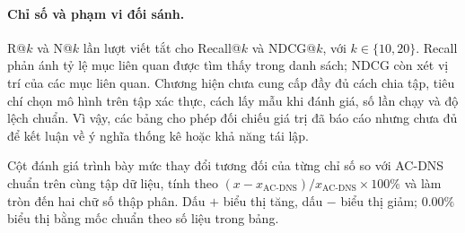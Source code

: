 \paragraph{Chỉ số và phạm vi đối sánh.}
R@$k$ và N@$k$ lần lượt viết tắt cho Recall@$k$ và NDCG@$k$, với $k\in\{10,20\}$. Recall phản ánh tỷ lệ mục liên quan được tìm thấy trong danh sách; NDCG còn xét vị trí của các mục liên quan. Chương hiện chưa cung cấp đầy đủ cách chia tập, tiêu chí chọn mô hình trên tập xác thực, cách lấy mẫu khi đánh giá, số lần chạy và độ lệch chuẩn. Vì vậy, các bảng cho phép đối chiếu giá trị đã báo cáo nhưng chưa đủ để kết luận về ý nghĩa thống kê hoặc khả năng tái lập.

Cột đánh giá trình bày mức thay đổi tương đối của từng chỉ số so với AC-DNS chuẩn trên cùng tập dữ liệu, tính theo $(x-x_{\text{AC-DNS}})/x_{\text{AC-DNS}}\times100\%$ và làm tròn đến hai chữ số thập phân. Dấu $+$ biểu thị tăng, dấu $-$ biểu thị giảm; $0.00\%$ biểu thị bằng mốc chuẩn theo số liệu trong bảng.

